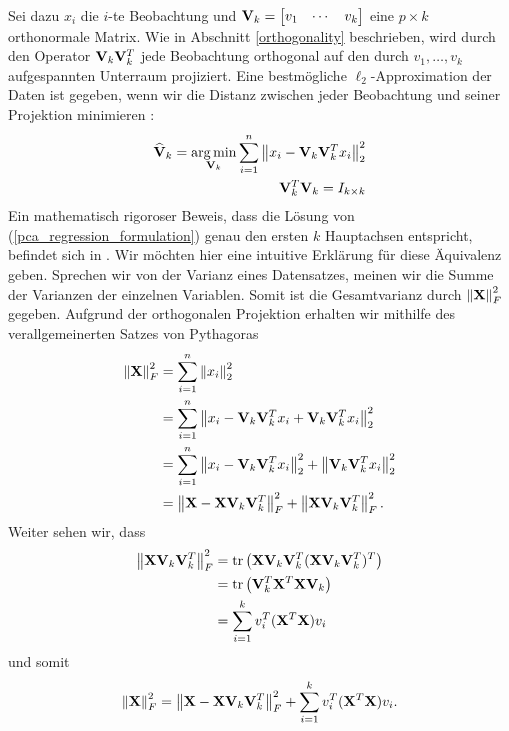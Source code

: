 Sei dazu $x_i$ die $i$-te Beobachtung und $\mathbf{V}_k = \begin{bmatrix} v_1 & \cdots & v_k \end{bmatrix}$ eine $p \times k$ orthonormale Matrix. Wie in Abschnitt \ref{orthogonality} beschrieben, wird durch den Operator $\mathbf{V}_k \mathbf{V}_k^T$ jede Beobachtung orthogonal auf den durch $v_1, \ldots , v_k$ aufgespannten Unterraum projiziert. Eine bestmögliche $\ell_2$-Approximation der Daten ist gegeben, wenn wir die Distanz zwischen jeder Beobachtung und seiner Projektion minimieren \cite{zou_sparsepca}:
\begin{align}
\label{pca_regression_formulation}
\begin{split}
\mathbf{\widehat{V}}_k = \operatorname*{arg\,min}_{\mathbf{V}_k} \sum_{i=1}^{n} \left\lVert x_i - \mathbf{V}_k \mathbf{V}_k^Tx_i \right\rVert_2^2\\
\mathbf{V}_k^T\mathbf{V}_k = I_{k \times k}
\end{split}
\end{align}
Ein mathematisch rigoroser Beweis, dass die Lösung von (\ref{pca_regression_formulation}) genau den ersten $k$ Hauptachsen entspricht, befindet sich in \cite{vidal}. Wir möchten hier eine intuitive Erklärung für diese Äquivalenz geben. Sprechen wir von der Varianz eines Datensatzes, meinen wir die Summe der Varianzen der einzelnen Variablen. Somit ist die Gesamtvarianz durch $\left\lVert \mathbf{X} \right\rVert_{F}^{2}$ gegeben. Aufgrund der orthogonalen Projektion erhalten wir mithilfe des verallgemeinerten Satzes von Pythagoras
\begin{align*}
\left\lVert \mathbf{X} \right\rVert_{F}^{2} & = \sum_{i=1}^{n} \left\lVert x_i \right\rVert_{2}^{2}\\
& = \sum_{i=1}^{n} \left\lVert x_i - \mathbf{V}_k \mathbf{V}_k^T x_i + \mathbf{V}_k \mathbf{V}_k^T x_i \right\rVert_{2}^{2}\\
& = \sum_{i=1}^{n} \left\lVert x_i - \mathbf{V}_k \mathbf{V}_k^T x_i \right\rVert_2^2 + \left\lVert \mathbf{V}_k \mathbf{V}_k^T x_i \right\rVert_{2}^{2}\\
& = \left\lVert \mathbf{X} - \mathbf{X} \mathbf{V}_k \mathbf{V}_k^T \right\rVert_{F}^{2} + \left\lVert \mathbf{X} \mathbf{V}_k \mathbf{V}_k^T \right\rVert_{F}^{2}.
\end{align*}
Weiter sehen wir, dass
\begin{align*}
\left\lVert \mathbf{X} \mathbf{V}_k \mathbf{V}_k^T \right\rVert_{F}^{2} & = \text{tr} \left( \mathbf{X} \mathbf{V}_k \mathbf{V}_k^T (\mathbf{X} \mathbf{V}_k \mathbf{V}_k^T)^T \right)\\
& = \text{tr} \left( \mathbf{V}_k^T \mathbf{X}^T \mathbf{X} \mathbf{V}_k \right)\\
& = \sum_{i=1}^{k} v_i^T (\mathbf{X}^T \mathbf{X}) v_i
\end{align*}
und somit
\begin{align*}
\left\lVert \mathbf{X} \right\rVert_{F}^{2} = \left\lVert \mathbf{X} - \mathbf{X} \mathbf{V}_k \mathbf{V}_k^T \right\rVert_{F}^{2} + \sum_{i=1}^{k} v_i^T (\mathbf{X}^T \mathbf{X}) v_i.
\end{align*} 

